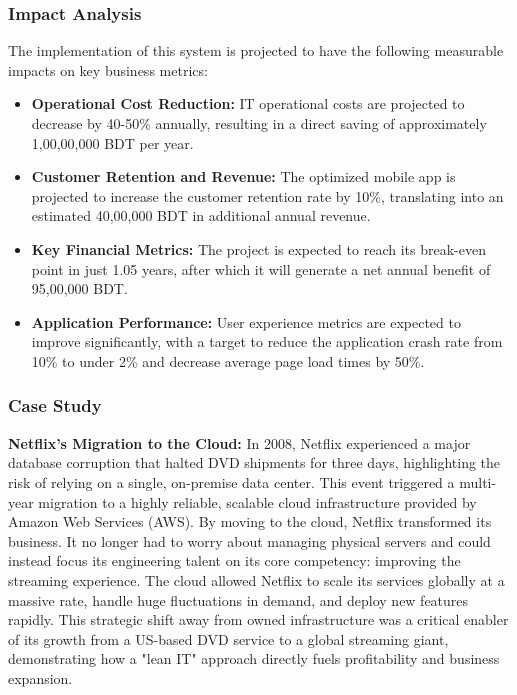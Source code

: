 \documentclass[12pt,a4paper]{article}
\begin{document}
\subsubsection{Impact Analysis}
The implementation of this system is projected to have the following measurable impacts on key business metrics:

\begin{itemize}
    \item \textbf{Operational Cost Reduction:} IT operational costs are projected to decrease by 40-50\% annually, resulting in a direct saving of approximately 1,00,00,000 BDT per year.
    \item \textbf{Customer Retention and Revenue:} The optimized mobile app is projected to increase the customer retention rate by 10\%, translating into an estimated 40,00,000 BDT in additional annual revenue.
    \item \textbf{Key Financial Metrics:} The project is expected to reach its break-even point in just 1.05 years, after which it will generate a net annual benefit of 95,00,000 BDT.
    \item \textbf{Application Performance:} User experience metrics are expected to improve significantly, with a target to reduce the application crash rate from 10\% to under 2\% and decrease average page load times by 50\%.
\end{itemize}

\subsubsection{Case Study}

\textbf{Netflix's Migration to the Cloud:} In 2008, Netflix experienced a major database corruption that halted DVD shipments for three days, highlighting the risk of relying on a single, on-premise data center. This event triggered a multi-year migration to a highly reliable, scalable cloud infrastructure provided by Amazon Web Services (AWS). By moving to the cloud, Netflix transformed its business. It no longer had to worry about managing physical servers and could instead focus its engineering talent on its core competency: improving the streaming experience. The cloud allowed Netflix to scale its services globally at a massive rate, handle huge fluctuations in demand, and deploy new features rapidly. This strategic shift away from owned infrastructure was a critical enabler of its growth from a US-based DVD service to a global streaming giant, demonstrating how a "lean IT" approach directly fuels profitability and business expansion.
\end{document}
